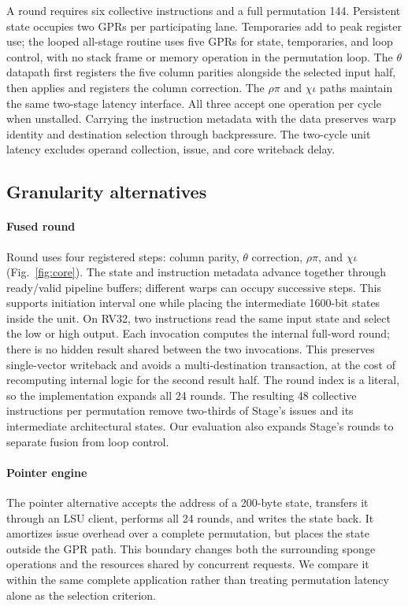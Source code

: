 \documentclass[conference,letterpaper]{IEEEtran}
\begin{document}
A round requires six collective instructions and a full permutation 144.
Persistent state occupies two GPRs per participating lane. Temporaries add
to peak register use; the looped all-stage routine uses five GPRs for state,
temporaries, and loop control, with no stack frame or memory operation in
the permutation loop. The $\theta$ datapath first registers the five column parities alongside
the selected input half, then applies and registers the column correction.
The $\rho\pi$ and $\chi\iota$ paths maintain the same two-stage latency
interface. All three accept one operation per cycle when unstalled.
Carrying the instruction metadata with the data preserves warp identity
and destination selection through backpressure. The two-cycle unit latency
excludes operand collection, issue, and core writeback delay.

\subsection{Granularity alternatives}
\paragraph{Fused round}
Round uses four registered steps: column parity, $\theta$ correction,
$\rho\pi$, and $\chi\iota$ (Fig.~\ref{fig:core}). The state and instruction
metadata advance together through ready/valid pipeline buffers; different
warps can occupy successive steps. This supports initiation interval one
while placing the intermediate 1600-bit states inside the unit.
On RV32, two instructions read the same input state and select the low or
high output. Each invocation computes the internal full-word round; there
is no hidden result shared between the two invocations. This preserves
single-vector writeback and avoids a multi-destination transaction, at the
cost of recomputing internal logic for the second result half.
The round index is a literal, so the implementation expands all 24 rounds.
The resulting 48 collective instructions per permutation remove two-thirds
of Stage's issues and its intermediate architectural states. Our evaluation
also expands Stage's rounds to separate fusion from loop control.

\paragraph{Pointer engine}
The pointer alternative accepts the address of a 200-byte state, transfers
it through an LSU client, performs all 24 rounds, and writes the state back.
It amortizes issue overhead over a complete permutation, but places the
state outside the GPR path. This boundary changes both the surrounding
sponge operations and the resources shared by concurrent requests. We
compare it within the same complete application rather than treating
permutation latency alone as the selection criterion.
\end{document}
